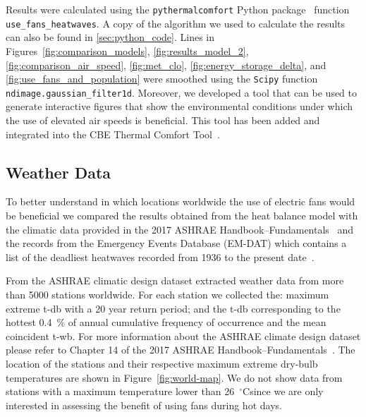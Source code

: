 Results were calculated using the  \verb|pythermalcomfort| Python package~\cite{Tartarini2020a} function \verb|use_fans_heatwaves|.
A copy of the algorithm we used to calculate the results can also be found in \ref{sec:python_code}.
Lines in Figures~\ref{fig:comparison_models}, \ref{fig:results_model_2}, \ref{fig:comparison_air_speed}, \ref{fig:met_clo}, \ref{fig:energy_storage_delta}, and \ref{fig:use_fans_and_population} were smoothed using the \verb|Scipy| function \verb|ndimage.gaussian_filter1d|.
Moreover, we developed a tool that can be used to generate interactive figures that show the environmental conditions under which the use of elevated air speeds is beneficial.
This tool has been added and integrated into the CBE Thermal Comfort Tool~\cite{Tartarini2020}.

\subsection{Weather Data}\label{subsec:weather-data}

To better understand in which locations worldwide the use of electric fans would be beneficial we compared the results obtained from the heat balance model with the climatic data provided in the 2017 ASHRAE Handbook--Fundamentals~\cite{ASHRA2017} and the records from the Emergency Events Database (EM-DAT) which contains a list of the deadliest heatwaves recorded from 1936 to the present date~\cite{EMDATThe70:online}.

From the ASHRAE climatic design dataset extracted weather data from more than 5000 stations worldwide.
For each station we collected the: maximum extreme \ac{t-db} with a 20 year return period;
and the \ac{t-db} corresponding to the hottest 0.4~\% of annual cumulative frequency of occurrence and the mean coincident \ac{t-wb}.
For more information about the ASHRAE climate design dataset please refer to Chapter 14 of the 2017 ASHRAE Handbook--Fundamentals~\cite{ASHRA2017}.
The location of the stations and their respective maximum extreme dry-bulb temperatures are shown in Figure~\ref{fig:world-map}.
We do not show data from stations with a maximum temperature lower than 26~$^\circ$C\@ since we are only interested in assessing the benefit of using fans during hot days.

